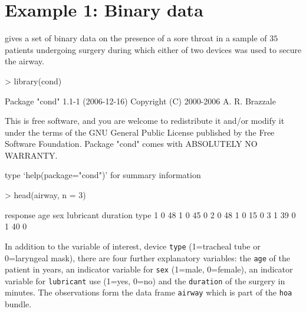\documentclass[a4paper,11pt]{article}
\def\code{\texttt}
\begin{document}
\section*{Example 1: Binary data}
%
\citet{collet:1998} gives a set of binary data on the presence of a sore throat in a sample of $35$ patients undergoing surgery during which either of two devices was used to secure the airway.  
%
\begin{Schunk}
\begin{Sinput}
> library(cond)
\end{Sinput}
\begin{Soutput}
   Package "cond" 1.1-1 (2006-12-16) 
   Copyright (C) 2000-2006 A. R. Brazzale

This is free software, and you are welcome to redistribute
it and/or modify it under the terms of the GNU General
Public License published by the Free Software Foundation.
Package "cond" comes with ABSOLUTELY NO WARRANTY.

type `help(package="cond")' for summary information
\end{Soutput}
\begin{Sinput}
> head(airway, n = 3)
\end{Sinput}
\begin{Soutput}
  response age sex lubricant duration type
1        0  48   1         0       45    0
2        0  48   1         0       15    0
3        1  39   0         1       40    0
\end{Soutput}
\end{Schunk}
%
In addition to the variable of interest, device \code{type}  (1=tracheal tube or 0=laryngeal mask), there are four further explanatory variables: the \code{age} of the patient in years, an indicator variable for \code{sex} (1=male, 0=female), an indicator variable for \code{lubricant} use (1=yes, 0=no) and the \code{duration} of the surgery in minutes.  The observations form the data frame \code{airway} which is part of the \code{hoa} bundle. 
\end{document}
